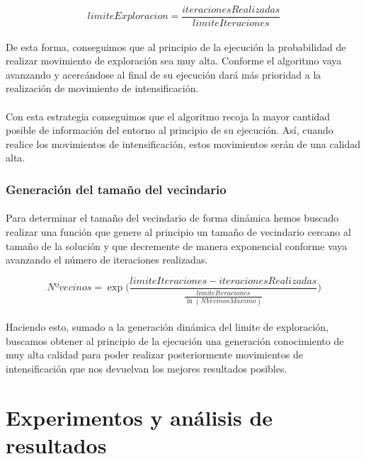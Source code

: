 \documentclass{article}
\begin{document}
		\[ limiteExploracion = \frac{iteracionesRealizadas}{limiteIteraciones}\]
		
		\paragraph{}De esta forma, conseguimos que al principio de la ejecución la probabilidad de realizar movimiento de exploración sea muy alta. Conforme el algoritmo vaya avanzando y acercándose al final de su ejecución dará más prioridad a la realización de movimiento de intensificación.
		
		\paragraph{}Con esta estrategia conseguimos que el algoritmo recoja la mayor cantidad posible de información del entorno al principio de su ejecución. Así, cuando realice los movimientos de intensificación, estos movimientos serán de una calidad alta.
		
		\subsubsection{Generación del tamaño del vecindario}
		
		\paragraph{}Para determinar el tamaño del vecindario de forma dinámica hemos buscado realizar una función que genere al principio un tamaño de vecindario cercano al tamaño de la solución y que decremente de manera exponencial conforme vaya avanzando el número de iteraciones realizadas.
		
		\[
		Nº vecinos = \exp\biggl( \frac{limiteIteraciones-iteracionesRealizadas}{\frac{limiteIteraciones}{\ln (NVecinosMaximo) }} \biggr)
		\]
		
		\paragraph{}Haciendo esto, sumado a la generación dinámica del limite de exploración, buscamos obtener al principio de la ejecución una generación conocimiento de muy alta calidad para poder realizar posteriormente movimientos de intensificación que nos devuelvan los mejores resultados posibles.
		
		
	
	\section{Experimentos y análisis de resultados}
	
\end{document}
